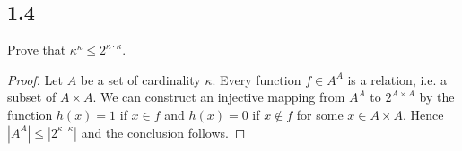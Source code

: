 \subsection*{1.4} Prove that $\kappa^\kappa \leq 2 ^{\kappa \cdot \kappa}$.

\begin{proof}
Let $A$ be a set of cardinality $\kappa$. Every function $f \in A^A$ is a relation, i.e. a subset of $A \times A$. We can construct an injective mapping from $A^A$ to $2^{A \times A}$ by the function $h(x) = 1$ if $x \in f$ and $h(x) = 0$ if $x \notin f$ for some $x \in A \times A$. Hence $|A^A| \leq |2^{\kappa \cdot \kappa}|$ and the conclusion follows.
\end{proof}

